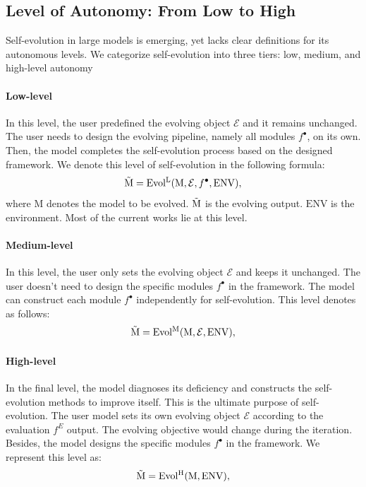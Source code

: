 \documentclass[sn-basic, Numbered]{sn-jnl}%
\def\gE{{\mathcal{E}}}
\theoremstyle{thmstyleone}%
\theoremstyle{thmstyletwo}%
\theoremstyle{thmstylethree}%
\begin{document}
\subsection{Level of Autonomy: From Low to High}
\label{sec:autonomous level}
Self-evolution in large models is emerging, yet lacks clear definitions for its autonomous levels. We categorize self-evolution into three tiers: low, medium, and high-level autonomy
\noindent\paragraph{Low-level} In this level, the user predefined the evolving object $\gE$ and it remains unchanged. The user needs to design the evolving pipeline, namely all modules $f^{\bullet}$, on its own. Then, the model completes the self-evolution process based on the designed framework. We denote this level of self-evolution in the following formula:
\begin{equation}
    \mathrm{\Tilde{M}} = \mathrm{Evol^{L}}(\mathrm{M}, \gE, f^{\bullet}, \mathrm{ENV}),
\end{equation}
where $\mathrm{M}$ denotes the model to be evolved. $\mathrm{\Tilde{M}}$ is the evolving output. $\mathrm{ENV}$ is the environment. Most of the current works lie at this level.

\noindent\paragraph{Medium-level} In this level, the user only sets the evolving object $\gE$ and keeps it unchanged. 
The user doesn't need to design the specific modules $f^{\bullet}$ in the framework. The model can construct each module $f^{\bullet}$ independently for self-evolution. This level denotes as follows:
\begin{equation}
    \mathrm{\Tilde{M}} = \mathrm{Evol^{M}}(\mathrm{M}, \gE, \mathrm{ENV}),
\end{equation}

\noindent\paragraph{High-level} In the final level, the model diagnoses its deficiency and constructs the self-evolution methods to improve itself. This is the ultimate purpose of self-evolution. The user model sets its own evolving object $\gE$ according to the evaluation $f^{E}$ output. The evolving objective would change during the iteration. 
Besides, the model designs the specific modules $f^{\bullet}$ in the framework. 
We represent this level as:
\begin{equation}
    \mathrm{\Tilde{M}} = \mathrm{Evol^{H}}(\mathrm{M}, \mathrm{ENV}),
\end{equation}
\end{document}

